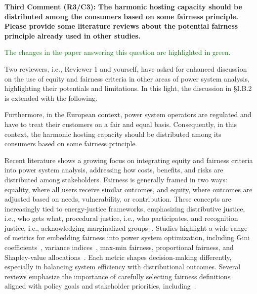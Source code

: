 \documentclass[10pt]{article}
\begin{document}
\textbf{Third Comment (R3/C3): The harmonic hosting capacity should be distributed among the consumers based on some fairness principle. Please provide some literature reviews about the potential fairness principle already used in other studies.}

\begin{tcolorbox}[colback=black!5!white,colframe=black]
\textcolor{green}{The changes in the paper answering this question are highlighted in green.} \newline 

Two reviewers, i.e., Reviewer 1 and yourself, have asked for enhanced discussion on the use of equity and fairness criteria in other areas of power system analysis, highlighting their potentials and limitations. In this light, the discussion in \S I.B.2 is extended with the following. \newline

Furthermore, in the European context, power system operators are regulated and have to treat their customers on a fair and equal basis. Consequently, in this context, the harmonic hosting capacity should be distributed among its consumers based on some fairness principle. \newline

Recent literature shows a growing focus on integrating equity and fairness criteria into power system analysis, addressing how costs, benefits, and risks are distributed among stakeholders. Fairness is generally framed in two ways: equality, where all users receive similar outcomes, and equity, where outcomes are adjusted based on needs, vulnerability, or contribution. These concepts are increasingly tied to energy-justice frameworks, emphasizing distributive justice, i.e., who gets what, procedural justice, i.e., who participates, and recognition justice, i.e., acknowledging marginalized groups~\cite{goforth_incorporating_2025}. Studies highlight a wide range of metrics for embedding fairness into power system optimization, including Gini coefficients~\cite{sun_gini_2020}, variance indices~\cite{heylen_fairness_2019}, max-min fairness, proportional fairness, and Shapley-value allocations~\cite{obrien_shapley_2015}. Each metric shapes decision-making differently, especially in balancing system efficiency with distributional outcomes. Several reviews emphasize the importance of carefully selecting fairness definitions aligned with policy goals and stakeholder priorities, including~\cite{goforth_incorporating_2025}.\newline


\end{tcolorbox}
\end{document}
